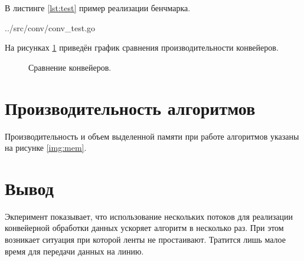 В листинге \ref{lst:test} пример реализации бенчмарка.

\begin{lstinputlisting}[
	caption={Реализация бенчмарка},
	label={lst:test},
	style={go},
	linerange={5-11},
	]{../src/conv/conv_test.go}
\end{lstinputlisting}

На рисунках \ref{plt:time} приведён график сравнения производительности конвейеров.

\begin{figure}[!hb]
	\centering
	\captionsetup{justification=centering}
	\caption{Сравнение конвейеров.}
	\label{plt:time}
\end{figure}


\newpage
\section{Производительность алгоритмов}

Производительность и объем выделенной памяти при работе алгоритмов указаны на рисунке \ref{img:mem}.


\section*{Вывод}

Экперимент показывает, что использование нескольких потоков для реализации конвейерной обработки данных ускоряет алгоритм в несколько раз. При этом возникает ситуация при которой ленты не простаивают. Тратится лишь малое время для передачи данных на линию.
